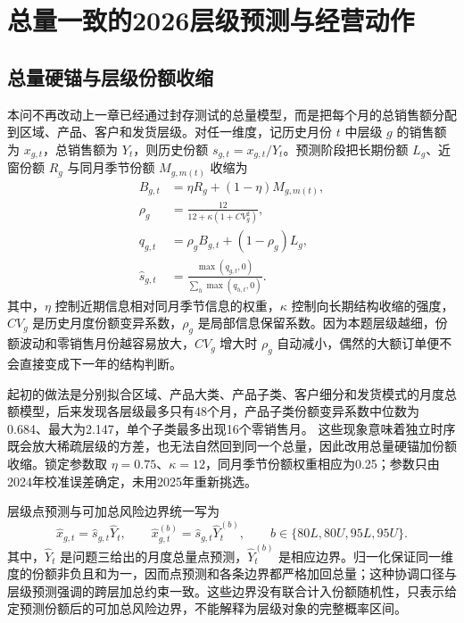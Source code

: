 \section{总量一致的2026层级预测与经营动作} %

\subsection{总量硬锚与层级份额收缩}

本问不再改动上一章已经通过封存测试的总量模型，而是把每个月的总销售额分配到区域、产品、客户和发货层级。对任一维度，记历史月份 $t$ 中层级 $g$ 的销售额为 $x_{g,t}$，总销售额为 $Y_t$，则历史份额 $s_{g,t}=x_{g,t}/Y_t$。预测阶段把长期份额 $L_g$、近窗份额 $R_g$ 与同月季节份额 $M_{g,m(t)}$ 收缩为
\begin{equation}
\begin{aligned}
    B_{g,t}&=\eta R_g+(1-\eta)M_{g,m(t)},\\
    \rho_g&=\frac{12}{12+\kappa(1+CV_g^2)},\\
    q_{g,t}&=\rho_gB_{g,t}+(1-\rho_g)L_g,\\
    \widehat s_{g,t}&=\frac{\max(q_{g,t},0)}{\sum_h\max(q_{h,t},0)}.
\end{aligned}
\end{equation} %
其中，$\eta$ 控制近期信息相对同月季节信息的权重，$\kappa$ 控制向长期结构收缩的强度，$CV_g$ 是历史月度份额变异系数，$\rho_g$ 是局部信息保留系数。因为本题层级越细，份额波动和零销售月份越容易放大，$CV_g$ 增大时 $\rho_g$ 自动减小，偶然的大额订单便不会直接变成下一年的结构判断。

起初的做法是分别拟合区域、产品大类、产品子类、客户细分和发货模式的月度总额模型，后来发现各层级最多只有48个月，产品子类份额变异系数中位数为0.684、最大为2.147，单个子类最多出现16个零销售月。%
这些现象意味着独立时序既会放大稀疏层级的方差，也无法自然回到同一个总量，因此改用总量硬锚加份额收缩。锁定参数取 $\eta=0.75$、$\kappa=12$，同月季节份额权重相应为0.25；参数只由2024年校准误差确定，未用2025年重新挑选。%

层级点预测与可加总风险边界统一写为
\begin{equation}
    \widehat x_{g,t}=\widehat s_{g,t}\widehat Y_t,
    \qquad
    \widehat x^{(b)}_{g,t}=\widehat s_{g,t}\widehat Y_t^{(b)},
    \qquad b\in\{80L,80U,95L,95U\}.
\end{equation} %
其中，$\widehat Y_t$ 是问题三给出的月度总量点预测，$\widehat Y_t^{(b)}$ 是相应边界。归一化保证同一维度的份额非负且和为一，因而点预测和各条边界都严格加回总量；这种协调口径与层级预测强调的跨层加总约束一致\cite{hyndman2011hierarchical}。这些边界没有联合计入份额随机性，只表示给定预测份额后的可加总风险边界，不能解释为层级对象的完整概率区间。

